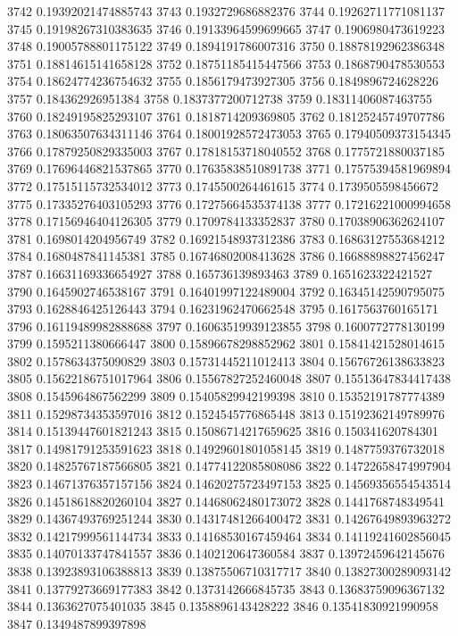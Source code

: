 3742 0.19392021474885743
3743 0.1932729686882376
3744 0.19262711771081137
3745 0.19198267310383635
3746 0.19133964599699665
3747 0.1906980473619223
3748 0.19005788801175122
3749 0.1894191786007316
3750 0.18878192962386348
3751 0.18814615141658128
3752 0.18751185415447566
3753 0.1868790478530553
3754 0.18624774236754632
3755 0.1856179473927305
3756 0.1849896724628226
3757 0.184362926951384
3758 0.1837377200712738
3759 0.18311406087463755
3760 0.18249195825293107
3761 0.1818714209369805
3762 0.18125245749707786
3763 0.18063507634311146
3764 0.18001928572473053
3765 0.17940509373154345
3766 0.17879250829335003
3767 0.17818153718040552
3768 0.1775721880037185
3769 0.17696446821537865
3770 0.17635838510891738
3771 0.17575394581969894
3772 0.17515115732534012
3773 0.1745500264461615
3774 0.1739505598456672
3775 0.17335276403105293
3776 0.17275664535374138
3777 0.17216221000994658
3778 0.17156946404126305
3779 0.1709784133352837
3780 0.17038906362624107
3781 0.1698014204956749
3782 0.16921548937312386
3783 0.16863127553684212
3784 0.1680487841145381
3785 0.16746802008413628
3786 0.16688898827456247
3787 0.16631169336654927
3788 0.165736139893463
3789 0.1651623322421527
3790 0.1645902746538167
3791 0.16401997122489004
3792 0.16345142590795075
3793 0.1628846425126443
3794 0.16231962470662548
3795 0.1617563760165171
3796 0.16119489982888688
3797 0.16063519939123855
3798 0.1600772778130199
3799 0.1595211380666447
3800 0.15896678298852962
3801 0.15841421528014615
3802 0.1578634375090829
3803 0.15731445211012413
3804 0.15676726138633823
3805 0.15622186751017964
3806 0.15567827252460048
3807 0.15513647834417438
3808 0.1545964867562299
3809 0.15405829942199398
3810 0.15352191787774389
3811 0.15298734353597016
3812 0.1524545776865448
3813 0.15192362149789976
3814 0.15139447601821243
3815 0.15086714217659625
3816 0.150341620784301
3817 0.14981791253591623
3818 0.14929601801058145
3819 0.1487759376732018
3820 0.14825767187566805
3821 0.14774122085808086
3822 0.14722658474997904
3823 0.14671376357157156
3824 0.14620275723497153
3825 0.14569356554543514
3826 0.14518618820260104
3827 0.14468062480173072
3828 0.1441768748349541
3829 0.14367493769251244
3830 0.14317481266400472
3831 0.14267649893963272
3832 0.14217999561144734
3833 0.14168530167459464
3834 0.14119241602856045
3835 0.14070133747841557
3836 0.1402120647360584
3837 0.13972459642145676
3838 0.13923893106388813
3839 0.13875506710317717
3840 0.13827300289093142
3841 0.13779273669177383
3842 0.1373142666845735
3843 0.13683759096367132
3844 0.1363627075401035
3845 0.1358896143428222
3846 0.13541830921990958
3847 0.1349487899397898
